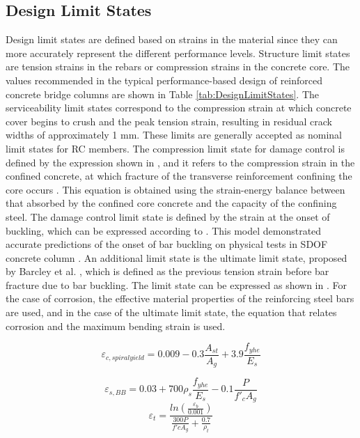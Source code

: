 \subsection{Design Limit States}
Design limit states are defined based on strains in the material since they can more accurately represent the different performance levels. Structure limit states are tension strains in the rebars or compression strains in the concrete core. The values recommended in the typical performance-based design of reinforced concrete bridge columns are shown in Table  \ref{tab:DesignLimitStates}. The serviceability limit states correspond to the compression strain at which concrete cover begins to crush and the peak tension strain, resulting in residual crack widths of approximately 1 mm. These limits are generally accepted as nominal limit states for RC members. The compression limit state for damage control is defined by the expression shown in , and it refers to the compression strain in the confined concrete, at which fracture of the transverse reinforcement confining the core occurs \cite{Priestley2007}. This equation is obtained using the strain-energy balance between that absorbed by the confined core concrete and the capacity of the confining steel. The damage control limit state is defined by the strain at the onset of buckling, which can be expressed according to . This model demonstrated accurate predictions of the onset of bar buckling on physical tests in SDOF concrete column \cite{Goodnight2016}. An additional limit state is the ultimate limit state, proposed by Barcley et al. \cite{Barcley2019}, which is defined as the previous tension strain before bar fracture due to bar buckling. The limit state can be expressed as shown in . For the case of corrosion, the effective material properties of the reinforcing steel bars are used, and in the case of the ultimate limit state, the equation that relates corrosion and the maximum bending strain is used.

\begin{equation}
    \varepsilon_{c,spiral yield}=0.009-0.3\frac{A_{st}}{A_{g}} +3.9\frac{f_{yhe}}{E_{s}}
    \label{eq:ec_DamageControl}
\end{equation}

\begin{equation}
    \varepsilon_{s,BB}=0.03+700\rho_{s}  \frac{f_{yhe}}{E_{s}} -0.1\frac{P}{f'_{c}A_{g}}
    \label{eq:es_DamageControl}
\end{equation}
\begin{equation}
    \varepsilon_{t}=\frac{ln(\frac{\varepsilon_{b}}{0.001})}{\frac{300P}{f'c A_{g}}+\frac{0.7}{\rho_{t}}}
    \label{eq:es_ultimate}
\end{equation}

